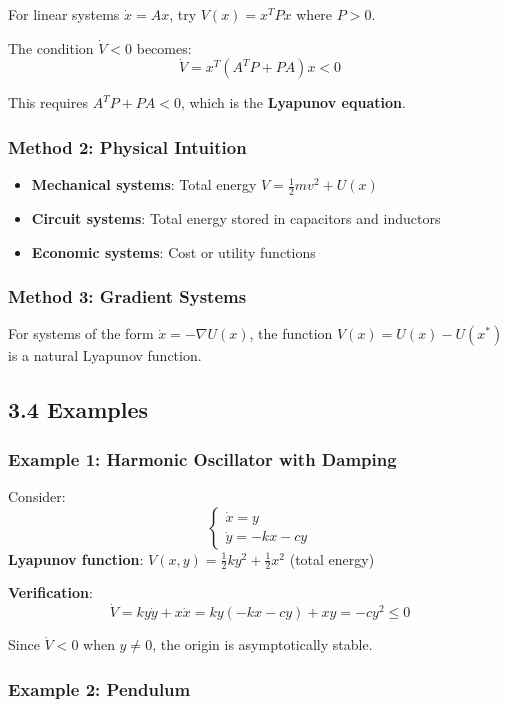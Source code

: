 \documentclass{amsart}
\theoremstyle{plain}
\theoremstyle{definition}
\theoremstyle{remark}
\begin{document}
For linear systems $\dot{x} = Ax$, try $V(x) = x^T P x$ where $P > 0$.

The condition $\dot{V} < 0$ becomes:
\[
\dot{V} = x^T(A^T P + PA)x < 0
\]

This requires $A^T P + PA < 0$, which is the \textbf{Lyapunov equation}.

\subsubsection{Method 2: Physical Intuition}

\begin{itemize}
	\item \textbf{Mechanical systems}: Total energy $V = \frac{1}{2}mv^2 + U(x)$
	\item \textbf{Circuit systems}: Total energy stored in capacitors and inductors
	\item \textbf{Economic systems}: Cost or utility functions
\end{itemize}

\subsubsection{Method 3: Gradient Systems}

For systems of the form $\dot{x} = -\nabla U(x)$, the function $V(x) = U(x) - U(x^*)$ is a natural Lyapunov function.

\subsection{3.4 Examples}

\subsubsection{Example 1: Harmonic Oscillator with Damping}

Consider:
\[
\begin{cases}
\dot{x} = y \\
\dot{y} = -kx - cy
\end{cases}
\]
\textbf{Lyapunov function}: $V(x,y) = \frac{1}{2}ky^2 + \frac{1}{2}x^2$ (total energy)

\textbf{Verification}:
\[
\dot{V} = ky\dot{y} + x\dot{x} = ky(-kx - cy) + xy = -cy^2 \leq 0
\]

Since $\dot{V} < 0$ when $y \neq 0$, the origin is asymptotically stable.

\subsubsection{Example 2: Pendulum}
\end{document}
